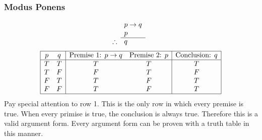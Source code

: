 \documentclass{report}
\begin{document}
\subsubsection*{Modus Ponens}
$$
	\argument{
		& p\lthen q & \\
		& p & \\
	}{q&}
$$
$$
	\begin{array}{|cc|cc|c|}
		\hline
		p & q & \text{Premise 1: } p\rightarrow q & \text{Premise 2: } p & \text{Conclusion: }  q \\ \hline
		T & T & T & T & T \\
		T & F & F & T & F \\
		F & T & T & F & T \\
		F & F & T & F & T \\ 
		\hline
	\end{array}
$$
Pay special attention to row 1. This is the only row in which every premise is true. When every primise is true, the conclusion is always true. Therefore this is a valid argument form. Every argument form can be proven with a truth table in this manner.
\end{document}
